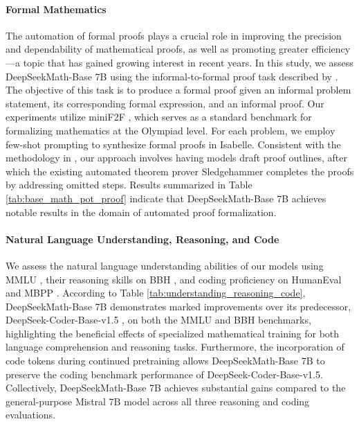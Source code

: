 \begin{itemize}[topsep=0pt]
\paragraph{Formal Mathematics}

The automation of formal proofs plays a crucial role in improving the precision and dependability of mathematical proofs, as well as promoting greater efficiency—a topic that has gained growing interest in recent years. In this study, we assess DeepSeekMath-Base 7B using the informal-to-formal proof task described by \citep{dsp_proof}. The objective of this task is to produce a formal proof given an informal problem statement, its corresponding formal expression, and an informal proof. Our experiments utilize miniF2F \citep{minif2f}, which serves as a standard benchmark for formalizing mathematics at the Olympiad level. For each problem, we employ few-shot prompting to synthesize formal proofs in Isabelle. Consistent with the methodology in \cite{dsp_proof}, our approach involves having models draft proof outlines, after which the existing automated theorem prover Sledgehammer \citep{sledgehammer} completes the proofs by addressing omitted steps. Results summarized in Table \ref{tab:base_math_pot_proof} indicate that DeepSeekMath-Base 7B achieves notable results in the domain of automated proof formalization.

\paragraph{Natural Language Understanding, Reasoning, and Code}

We assess the natural language understanding abilities of our models using MMLU \citep{mmlu}, their reasoning skills on BBH \citep{bbh}, and coding proficiency on HumanEval \citep{codex} and MBPP \citep{mbpp}. According to Table \ref{tab:understanding_reasoning_code}, DeepSeekMath-Base 7B demonstrates marked improvements over its predecessor, DeepSeek-Coder-Base-v1.5 \citep{deepseek-coder}, on both the MMLU and BBH benchmarks, highlighting the beneficial effects of specialized mathematical training for both language comprehension and reasoning tasks. Furthermore, the incorporation of code tokens during continued pretraining allows DeepSeekMath-Base 7B to preserve the coding benchmark performance of DeepSeek-Coder-Base-v1.5. Collectively, DeepSeekMath-Base 7B achieves substantial gains compared to the general-purpose Mistral 7B model \citep{mistral} across all three reasoning and coding evaluations.


\end{itemize}
